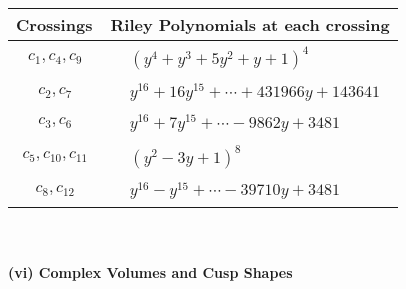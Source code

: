 \documentclass[1p]{elsarticle_modified}
\theoremstyle{definition}
\begin{document}
\begin{tabular}{m{50pt}|m{274pt}}
Crossings & \hspace{64pt}Riley Polynomials at each crossing \\
\hline $$\begin{aligned}c_{1},c_{4},c_{9}\end{aligned}$$&$\begin{aligned}
&(y^4+y^3+5 y^2+y+1)^4
\end{aligned}$\\
\hline $$\begin{aligned}c_{2},c_{7}\end{aligned}$$&$\begin{aligned}
&y^{16}+16 y^{15}+\cdots+431966 y+143641
\end{aligned}$\\
\hline $$\begin{aligned}c_{3},c_{6}\end{aligned}$$&$\begin{aligned}
&y^{16}+7 y^{15}+\cdots-9862 y+3481
\end{aligned}$\\
\hline $$\begin{aligned}c_{5},c_{10},c_{11}\end{aligned}$$&$\begin{aligned}
&(y^2-3 y+1)^8
\end{aligned}$\\
\hline $$\begin{aligned}c_{8},c_{12}\end{aligned}$$&$\begin{aligned}
&y^{16}- y^{15}+\cdots-39710 y+3481
\end{aligned}$\\
\hline
\end{tabular}\\~\\
\newpage\flushleft \textbf{(vi) Complex Volumes and Cusp Shapes}
\end{document}
